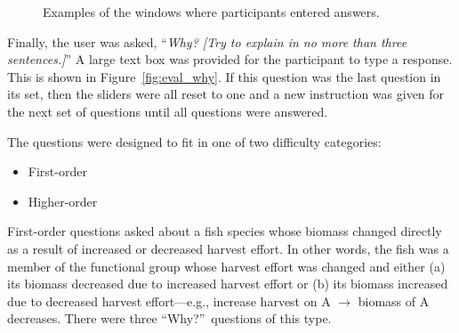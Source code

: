 \begin{figure}
\centering


	\caption[Examples of the windows where participants entered answers]{Examples of the windows where participants entered answers.}
	\label{fig:eval}
\end{figure}

Finally, the user was asked, ``\textit{Why? [Try to explain in no more than three sentences.]}''  A large text box was provided for the participant to type a response.  This is shown in Figure~\ref{fig:eval_why}. If this question was the last question in its set, then the sliders were all reset to one and a new instruction was given for the next set of questions until all questions were answered. 

The questions were designed to fit in one of two difficulty categories:
\begin{itemize}
\item First-order
\item Higher-order
\end{itemize}

First-order questions asked about a fish species whose biomass changed directly as a result of increased or decreased harvest effort.  In other words, the fish was a member of the functional group whose harvest effort was changed and either (a) its biomass decreased due to increased harvest effort or (b) its biomass increased due to decreased harvest effort---e.g.,  increase harvest on A $\rightarrow$ biomass of A decreases.  There were three ``Why?''\ questions of this type.

